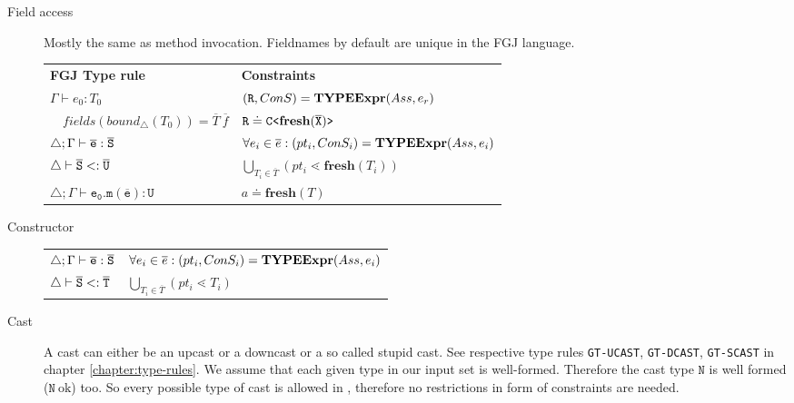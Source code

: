 \documentclass[a4paper,USenglish,cleveref, autoref, thm-restate]{lipics-v2021}
\begin{document}
\begin{description}
 \item[Field access]
Mostly the same as method invocation.
Fieldnames by default are unique in the FGJ language.

 \begin{tabular}{l|l}
   \textbf{FGJ Type rule} & \textbf{Constraints} \\
   $\Gamma \vdash e_0:T_0$ & $(\texttt{R}, ConS) = \textbf{TYPEExpr}(Ass, e_r)$\\ 
   $\quad \mathit{fields}(\mathit{bound}_\triangle(T_0)) = \overline{T} \ \overline{f}$ & $\texttt{R} \doteq \mathtt{C \texttt{<} \textbf{fresh}(\overline{\tt X}) \texttt{>} }$ \\
  $\triangle; \Gamma \vdash \overline{\tt e} : \overline{\tt S}$ & $\forall e_i \in \overline{e} : (pt_i, ConS_i) = \textbf{TYPEExpr}(Ass, e_i)$\\
  $\triangle \vdash \overline{\tt S} <: \overline{\tt U}$ & $ \bigcup_{T_i \in \overline{T}} (pt_i \lessdot \textbf{fresh}(T_i))$\\
  $\triangle; \Gamma \vdash \mathtt{e_0.m(\overline{e}) : U }$ & $a \doteq \textbf{fresh}(T)$ \\
 \end{tabular}
 \item[Constructor]

\begin{tabular}{l|l}
  $\triangle; \Gamma \vdash \overline{\tt e} : \overline{\tt S}$ & $\forall e_i \in \overline{e} : (pt_i, ConS_i) = \textbf{TYPEExpr}(Ass, e_i)$\\
  $\triangle \vdash \overline{\tt S} <: \overline{\tt T}$ & $\bigcup_{T_i \in \overline{T}} (pt_i \lessdot T_i)$
\end{tabular}

\item[Cast]
A cast can either be an upcast or a downcast or a so called stupid cast.
See respective type rules \texttt{GT-UCAST}, \texttt{GT-DCAST}, \texttt{GT-SCAST} in chapter \ref{chapter:type-rules}.
We assume that each given type in our input set is well-formed.
Therefore the cast type $\mathtt{N}$ is well formed ($\mathtt{N}\ \text{ok}$) too.
So every possible type of cast is allowed in \TFGJ, therefore no restrictions in form of constraints are needed.

\end{description}
\end{document}
